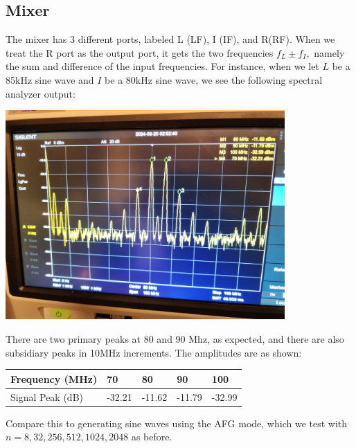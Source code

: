 \documentclass{article}
\begin{document}
    \subsection*{Mixer}
    The mixer has 3 different ports, labeled L (LF), I (IF), and R(RF). When we treat the R port as the output port, it gets the two frequencies $f_L \pm f_I,$ namely the sum and difference of the input frequencies. For instance, when we let $L$ be a 85kHz sine wave and $I$ be a 80kHz sine wave, we see the following spectral analyzer output:
    \begin{mdframed}[backgroundcolor=gray!20, align = center, userdefinedwidth = 4.5in]
    \includegraphics[width = 4.2in]{img/splitter_spectrum.jpg}\\
    \end{mdframed}
    There are two primary peaks at 80 and 90 Mhz, as expected, and there are also subsidiary peaks in 10MHz increments. The amplitudes are as shown:
    \begin{table}[H]
    \centering
    \begin{tabular}{|l|l|l|l|l|}
    \hline
    Frequency (MHz) & 70 & 80 & 90 & 100 \\ \hline
    Signal Peak (dB) & -32.21 & -11.62 & -11.79 & -32.99 \\ \hline
    \end{tabular}
    \end{table}
    Compare this to generating sine waves using the AFG mode, which we test with $n = 8, 32, 256, 512, 1024, 2048$ as before.\\\\
\end{document}
